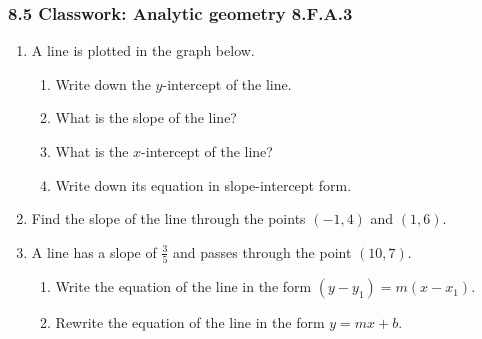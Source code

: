 \documentclass[12pt, twoside]{article}
\begin{document}
\subsubsection*{8.5 Classwork: Analytic geometry \hfill 8.F.A.3}
\begin{enumerate}

\item A line is plotted in the graph below.
\begin{multicols}{2}
    \begin{enumerate}[itemsep=0.5cm]
      \item Write down the $y$-intercept of the line.
      \item What is the slope of the line?
      \item What is the $x$-intercept of the line?
      \item Write down its equation in slope-intercept form.
      \end{enumerate}
    \begin{flushright}
    \end{flushright}
  \end{multicols} \vspace{2cm}

\item Find the slope of the line through the points $(-1, 4)$ and $(1, 6)$. \vspace{3cm}

\item A line has a slope of $\displaystyle \frac{3}{5}$ and passes through the point $(10, 7)$. 
  \begin{enumerate}[itemsep=1cm]
      \item Write the equation of the line in the form $(y-y_1)=m(x-x_1)$.
      \item Rewrite the equation of the line in the form $y=mx+b$. \vspace{4cm}
  \end{enumerate}

\newpage

\end{enumerate}
\end{document}
